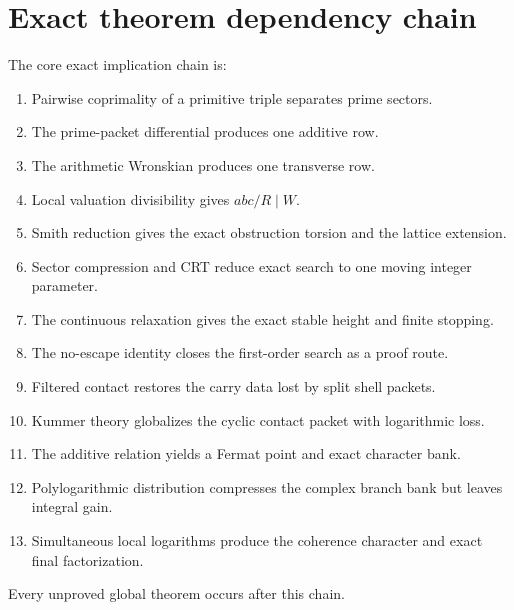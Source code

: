 \section{Exact theorem dependency chain}
The core exact implication chain is:

\begin{enumerate}[leftmargin=1.5em]
\item Pairwise coprimality of a primitive triple separates prime sectors.
\item The prime-packet differential produces one additive row.
\item The arithmetic Wronskian produces one transverse row.
\item Local valuation divisibility gives $abc/R\mid W$.
\item Smith reduction gives the exact obstruction torsion and the lattice extension.
\item Sector compression and CRT reduce exact search to one moving integer parameter.
\item The continuous relaxation gives the exact stable height and finite stopping.
\item The no-escape identity closes the first-order search as a proof route.
\item Filtered contact restores the carry data lost by split shell packets.
\item Kummer theory globalizes the cyclic contact packet with logarithmic loss.
\item The additive relation yields a Fermat point and exact character bank.
\item Polylogarithmic distribution compresses the complex branch bank but leaves integral gain.
\item Simultaneous local logarithms produce the coherence character and exact final factorization.
\end{enumerate}

Every unproved global theorem occurs after this chain.

